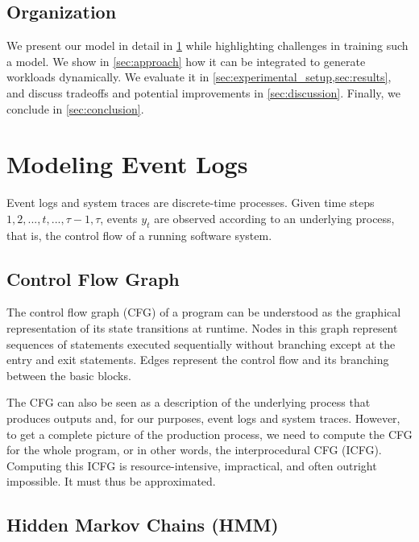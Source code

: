 \subsection{Organization}

We present our model in detail in \cref{sec:modeling_processes} while highlighting challenges in training such a model. We show in \cref{sec:approach} how it can be integrated to generate workloads dynamically. We evaluate it in \cref{sec:experimental_setup,sec:results}, and discuss tradeoffs and potential improvements in \cref{sec:discussion}. Finally, we conclude in \cref{sec:conclusion}.

\section{Modeling Event Logs}\label{sec:modeling_processes}

Event logs and system traces are discrete-time processes. Given time steps \(1, 2, ..., t, ..., \tau - 1, \tau\),  events \(y_t\) are observed according to an underlying process, that is, the control flow of a running software system.

\subsection{Control Flow Graph}

The control flow graph (CFG) of a program can be understood as the graphical representation of its state transitions at runtime. Nodes in this graph represent sequences of statements executed sequentially without branching except at the entry and exit statements. Edges represent the control flow and its branching between the basic blocks.

The CFG can also be seen as a description of the underlying process that produces outputs and, for our purposes, event logs and system traces. However, to get a complete picture of the production process, we need to compute the CFG for the whole program, or in other words, the interprocedural CFG (ICFG). Computing this ICFG is resource-intensive, impractical, and often outright impossible. It must thus be approximated\cite{Zhao2023-nh}.

\subsection{Hidden Markov Chains (HMM)}

